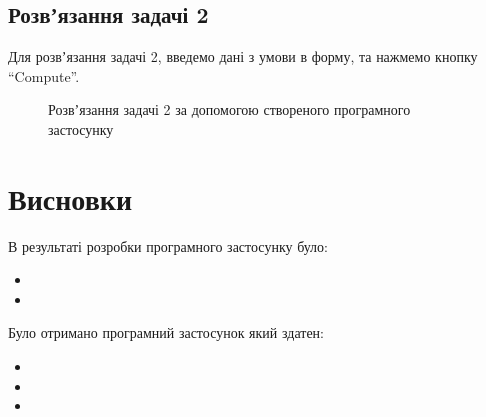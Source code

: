 \documentclass[../../../../document]{subfiles}
\begin{document}
	\section{Розвʼязання задачі 2}
	Для розвʼязання задачі 2, введемо дані з умови в форму, та нажмемо кнопку \enquote{Compute}.
	\begin{figure}[h]
		\centering
		\caption{Розвʼязання задачі 2 за допомогою створеного програмного застосунку}%
		\label{fig:test2}
	\end{figure}

	\FloatBarrier
	\chapter{Висновки}
	В результаті розробки програмного застосунку було:
	\begin{itemize}
		\item 
		\item
	\end{itemize}
	Було отримано програмний застосунок який здатен:
	\begin{itemize}
		\item
		\item
		\item
	\end{itemize}
\end{document}
